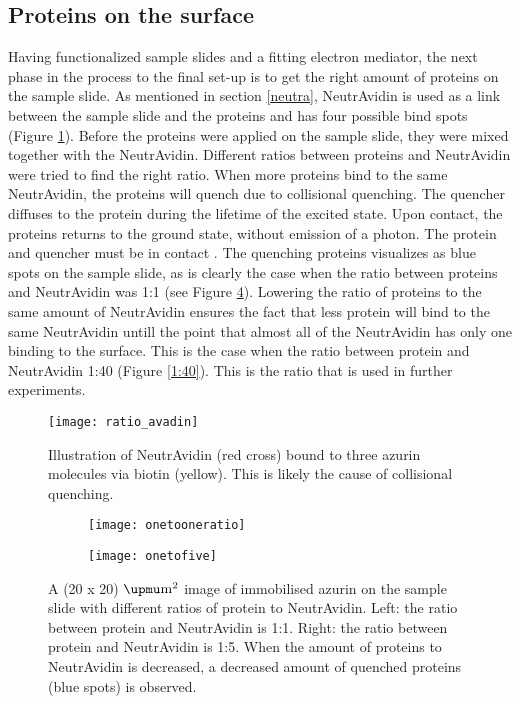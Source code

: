 \documentclass[twoside,single]{lion-msc}
\begin{document}
\subsection{Proteins on the surface}
Having functionalized sample slides and a fitting electron mediator, the next phase in the process to the final set-up is to get the right amount of proteins on the sample slide. As mentioned in section \ref{neutra},  NeutrAvidin is used as a link between the sample slide and the proteins and has four possible bind spots  (Figure \ref{avidinratio}). Before the proteins were applied on the sample slide, they were mixed together with the NeutrAvidin. Different ratios between proteins and NeutrAvidin were tried to find the right ratio. When more proteins bind to the same NeutrAvidin, the proteins will quench due to collisional quenching. The quencher diffuses to the protein during the lifetime of the excited state. Upon contact, the proteins returns to the ground state, without emission of a photon. The protein and quencher must be in contact \cite{Lakowicz2006}. The quenching proteins visualizes as blue spots on the sample slide, as is clearly the case when the ratio between proteins and NeutrAvidin was 1:1 (see Figure \ref{finding_proteins}). Lowering the ratio of proteins to the same amount of NeutrAvidin ensures the fact that less protein will bind to the same NeutrAvidin untill the point that almost all of the NeutrAvidin has only one binding to the surface. This is the case when the ratio between protein and NeutrAvidin 1:40 (Figure \ref{1:40}). This is the ratio that is used in further experiments.

\begin{figure}[ht!]
\centering
\texttt{[image: ratio\_avadin]}
\caption{Illustration of NeutrAvidin (red cross) bound to three azurin molecules via biotin (yellow). This is likely the cause of collisional quenching.}
\label{avidinratio}
\end{figure}


\begin{figure}
\begin{subfigure}{.5\textwidth}
  \centering
  \texttt{[image: onetooneratio]}
  \label{}
\end{subfigure}%
\begin{subfigure}{.5\textwidth}
  \centering
  \texttt{[image: onetofive]}
  \label{}
\end{subfigure}
\caption{A (20 x 20) $\upmu \textup{m}^{2}$ image of immobilised azurin on the sample slide with different ratios of protein to NeutrAvidin. Left: the ratio between protein and NeutrAvidin is 1:1. Right: the ratio between protein and NeutrAvidin is 1:5. When the amount of proteins to NeutrAvidin is decreased, a decreased amount of quenched proteins (blue spots) is observed.}
\label{finding_proteins}
\end{figure}
\end{document}
